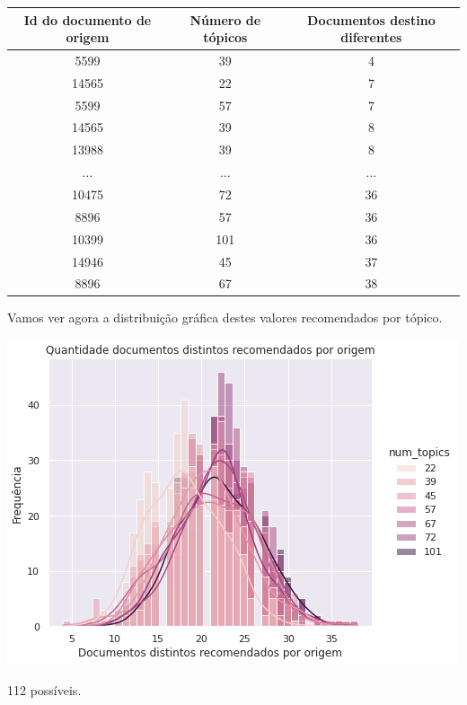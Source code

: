 \begin{center}
    \begin{tabular}{|c|c|c|}
        \hline
        Id do documento de origem & Número de tópicos & Documentos destino diferentes \\
        \hline
        5599 & 39 & 4 \\
        \hline
        14565 & 22 & 7 \\
        \hline
        5599 & 57 & 7 \\
        \hline
        14565 & 39 & 8 \\
        \hline
        13988 & 39 & 8 \\
        \hline
        ... & ... & ... \\
        \hline
        10475 & 72 & 36 \\
        \hline
        8896 & 57 & 36 \\
        \hline
        10399 & 101 & 36 \\
        \hline
        14946 & 45 & 37 \\
        \hline
        8896 & 67 & 38 \\
        \hline
    \end{tabular}
\end{center}

Vamos ver agora a distribuição gráfica destes valores recomendados por tópico.

\includegraphics[scale=0.7]{resultados/resources/distribuicao_semelhantes_distintos_topics.png}

112 possíveis.

